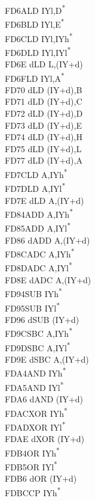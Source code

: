 \documentclass[oneside,a4paper]{book}
\begin{document}
\begin{multicols}{3}
{\begin{tabbing}
FD6A\>LD IYl,D\textsuperscript{*}\\
FD6B\>LD IYl,E\textsuperscript{*}\\
FD6C\>LD IYl,IYh\textsuperscript{*}\\
FD6D\>LD IYl,IYl\textsuperscript{*}\\
FD6E d\>LD L,(IY+d)\\
FD6F\>LD IYl,A\textsuperscript{*}\\
FD70 d\>LD (IY+d),B\\
FD71 d\>LD (IY+d),C\\
FD72 d\>LD (IY+d),D\\
FD73 d\>LD (IY+d),E\\
FD74 d\>LD (IY+d),H\\
FD75 d\>LD (IY+d),L\\
FD77 d\>LD (IY+d),A\\
FD7C\>LD A,IYh\textsuperscript{*}\\
FD7D\>LD A,IYl\textsuperscript{*}\\
FD7E d\>LD A,(IY+d)\\
FD84\>ADD A,IYh\textsuperscript{*}\\
FD85\>ADD A,IYl\textsuperscript{*}\\
FD86 d\>ADD A,(IY+d)\\
FD8C\>ADC A,IYh\textsuperscript{*}\\
FD8D\>ADC A,IYl\textsuperscript{*}\\
FD8E d\>ADC A,(IY+d)\\
FD94\>SUB IYh\textsuperscript{*}\\
FD95\>SUB IYl\textsuperscript{*}\\
FD96 d\>SUB (IY+d)\\
FD9C\>SBC A,IYh\textsuperscript{*}\\
FD9D\>SBC A,IYl\textsuperscript{*}\\
FD9E d\>SBC A,(IY+d)\\
FDA4\>AND IYh\textsuperscript{*}\\
FDA5\>AND IYl\textsuperscript{*}\\
FDA6 d\>AND (IY+d)\\
FDAC\>XOR IYh\textsuperscript{*}\\
FDAD\>XOR IYl\textsuperscript{*}\\
FDAE d\>XOR (IY+d)\\
FDB4\>OR IYh\textsuperscript{*}\\
FDB5\>OR IYl\textsuperscript{*}\\
FDB6 d\>OR (IY+d)\\
FDBC\>CP IYh\textsuperscript{*}\\

\end{tabbing}}
\end{multicols}
\end{document}
